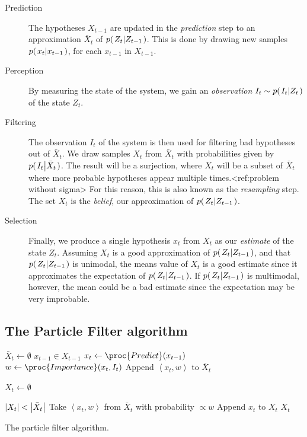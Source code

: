\begin{description}
    \item[Prediction] The hypotheses $X_{t-1}$ are updated in the \emph{prediction} step to an approximation $\bar{X}_t$ of $p{(\left. Z_t \middle\vert Z_{t-1} \right.)}$.
    This is done by drawing new samples $p{(\left. x_t \middle\vert x_{t-1} \right.)}$, for each $x_{t-1}$ in $X_{t-1}$.
    \item[Perception] By measuring the state of the system, we gain an \emph{observation} $I_t \sim p{(\left. I_t \middle\vert Z_t \right.)}$ of the state $Z_t$.
    \item[Filtering] The observation $I_t$ of the system is then used for filtering bad hypotheses out of $\bar{X}_t$. 
    We draw samples $X_t$ from $\bar{X}_t$ with probabilities given by $p{(\left. I_t \middle\vert \bar{X}_t \right.)}$. The result will be a surjection, where
    $X_t$ will be a subset of $\bar{X}_t$ where more probable hypotheses appear multiple times.<ref:problem without sigma>
    For this reason, this is also known as the \emph{resampling} step. The set $X_t$ is the \emph{belief}, 
    our approximation of $p{(\left. Z_t \middle\vert Z_{t-1} \right.)}$.
    \item[Selection] Finally, we produce a single hypothesis $x_t$ from $X_t$ as our \emph{estimate} 
    of the state $Z_t$. Assuming $X_t$ is a good approximation of $p{(\left. Z_t \middle\vert Z_{t-1} \right.)}$, and that $p{(\left. Z_t \middle\vert Z_{t-1} \right.)}$ is unimodal, 
    the means value of $X_t$ is a good estimate since it approximates the expectation of $p{(\left. Z_t \middle\vert Z_{t-1} \right.)}$. 
    If $p{(\left. Z_t \middle\vert Z_{t-1} \right.)}$ is multimodal, however, the mean could be a bad estimate since the expectation may be very improbable.

\end{description}

\subsection{The Particle Filter algorithm}
\begin{table}
  \begin{codebox}
    \li $\bar{X}_t \gets \emptyset$
    \li \ForEach $x_{t-1} \in X_{t-1}$
    \li \Do
    \li $x_t \gets \proc{Predict}(x_{t-1})$
    \li $w \gets \proc{Importance}(x_t,I_t)$
    \li Append $\left<x_t, w\right>$ to $\bar{X}_t$
    \End
    \li
    
    \li $X_t \gets \emptyset$
    
    \li \While $\left\vert X_t \right\vert < \left\vert \bar{X}_t \right\vert$
    \li \Do
    \li Take $\left<x_t, w\right>$ from $\bar{X}_t$ with probability $\propto w$
    \li Append $x_t$ to $X_t$
    \End
    \li \Return $X_t$
  \end{codebox}
  \caption{The particle filter algorithm.}
  \label{alg:pf}
\end{table}

